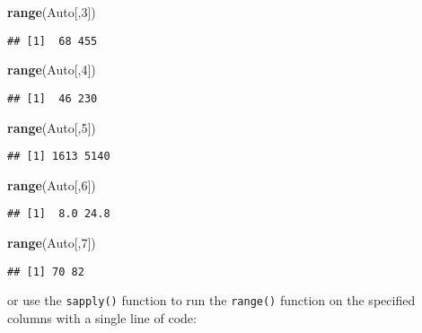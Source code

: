 \documentclass[]{article}
\newenvironment{Shaded}{\begin{snugshade}}{\end{snugshade}}
\newcommand{\DecValTok}[1]{\textcolor[rgb]{0.00,0.00,0.81}{#1}}
\newcommand{\KeywordTok}[1]{\textcolor[rgb]{0.13,0.29,0.53}{\textbf{#1}}}
\newcommand{\NormalTok}[1]{#1}
\begin{document}
\begin{Shaded}
\begin{Highlighting}[]
\KeywordTok{range}\NormalTok{(Auto[,}\DecValTok{3}\NormalTok{])}
\end{Highlighting}
\end{Shaded}

\begin{verbatim}
## [1]  68 455
\end{verbatim}

\begin{Shaded}
\begin{Highlighting}[]
\KeywordTok{range}\NormalTok{(Auto[,}\DecValTok{4}\NormalTok{])}
\end{Highlighting}
\end{Shaded}

\begin{verbatim}
## [1]  46 230
\end{verbatim}

\begin{Shaded}
\begin{Highlighting}[]
\KeywordTok{range}\NormalTok{(Auto[,}\DecValTok{5}\NormalTok{])}
\end{Highlighting}
\end{Shaded}

\begin{verbatim}
## [1] 1613 5140
\end{verbatim}

\begin{Shaded}
\begin{Highlighting}[]
\KeywordTok{range}\NormalTok{(Auto[,}\DecValTok{6}\NormalTok{])}
\end{Highlighting}
\end{Shaded}

\begin{verbatim}
## [1]  8.0 24.8
\end{verbatim}

\begin{Shaded}
\begin{Highlighting}[]
\KeywordTok{range}\NormalTok{(Auto[,}\DecValTok{7}\NormalTok{])}
\end{Highlighting}
\end{Shaded}

\begin{verbatim}
## [1] 70 82
\end{verbatim}

or use the \texttt{sapply()} function to run the \texttt{range()}
function on the specified columns with a single line of code:
\end{document}
